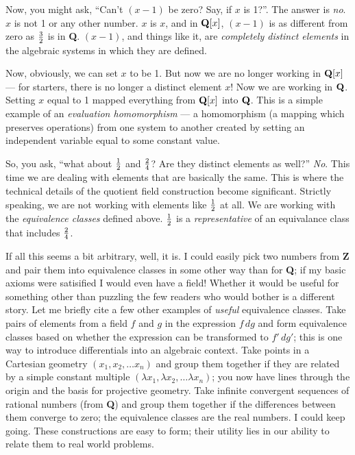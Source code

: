 Now, you might ask, ``Can't $(x-1)$ be zero?  Say, if $x$ is 1?''.
The answer is {\it no}.  $x$ is not 1 or any other number.  $x$ is
$x$, and in ${\bf Q}[x]$, $(x-1)$ is as different from zero as $3
\over 2$ is in {\bf Q}.  $(x-1)$, and things like it, are {\it
completely distinct elements} in the algebraic systems in which they
are defined.

Now, obviously, we can set $x$ to be 1.  But now we are no longer
working in ${\bf Q}[x]$ --- for starters, there is no longer a
distinct element $x$!  Now we are working in ${\bf Q}$.  Setting $x$
equal to 1 mapped everything from ${\bf Q}[x]$ into ${\bf Q}$.  This
is a simple example of an {\it evaluation homomorphism} --- a
homomorphism (a mapping which preserves operations) from one system to
another created by setting an independent variable equal to some
constant value.

So, you ask, ``what about $1\over2$ and $2\over4$?  Are they distinct
elements as well?''  {\it No}.  This time we are dealing with elements
that are basically the same. This is where the technical details of
the quotient field construction become significant.  Strictly
speaking, we are not working with elements like $1\over2$ at all.  We
are working with the {\it equivalence classes} defined above.
$1\over2$ is a {\it representative} of an equivalance class that
includes $2\over4$.

If all this seems a bit arbitrary, well, it is.  I could easily pick
two numbers from {\bf Z} and pair them into equivalence classes in
some other way than for {\bf Q}; if my basic axioms were satisified I
would even have a field!  Whether it would be useful for something
other than puzzling the few readers who would bother is a different
story.  Let me briefly cite a few other examples of {\it useful}
equivalence classes.  Take pairs of elements from a field $f$ and $g$
in the expression $f\,dg$ and form equivalence classes based on
whether the expression can be transformed to $f'\,dg'$; this is one
way to introduce differentials into an algebraic context.  Take points
in a Cartesian geometry $(x_1, x_2,\ldots x_n)$ and group them
together if they are related by a simple constant multiple $(\lambda
x_1, \lambda x_2,\ldots \lambda x_n)$; you now have lines through the
origin and the basis for projective geometry.  Take infinite
convergent sequences of rational numbers (from {\bf Q}) and group them
together if the differences between them converge to zero; the
equivalence classes are the real numbers.  I could keep going.  These
constructions are easy to form; their utility lies in our ability to
relate them to real world problems.

